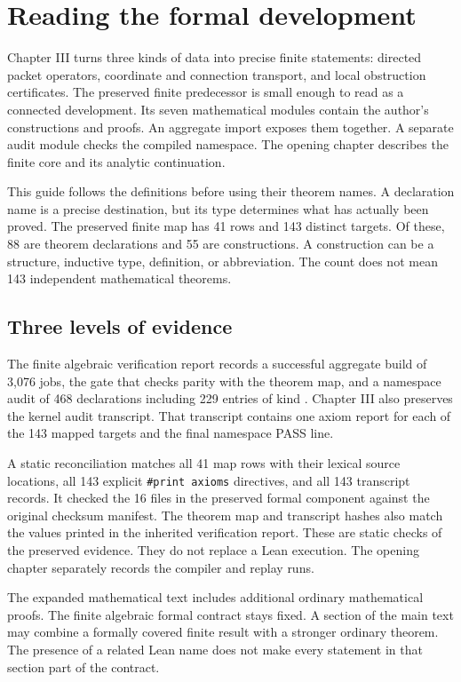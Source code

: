 \section{Reading the formal development}
Chapter III turns three kinds of data into precise finite statements: directed packet operators, coordinate and connection transport, and local obstruction certificates. The preserved finite predecessor is small enough to read as a connected development. Its seven mathematical modules contain the author's constructions and proofs. An aggregate import exposes them together. A separate audit module checks the compiled namespace. The opening chapter describes the finite core and its analytic continuation.

This guide follows the definitions before using their theorem names. A declaration name is a precise destination, but its type determines what has actually been proved. The preserved finite map has 41 rows and 143 distinct targets. Of these, 88 are theorem declarations and 55 are constructions. A construction can be a structure, inductive type, definition, or abbreviation. The count does not mean 143 independent mathematical theorems.

\subsection{Three levels of evidence}
The finite algebraic verification report records a successful aggregate build of 3,076 jobs, the gate that checks parity with the theorem map, and a namespace audit of 468 declarations including 229 entries of kind . Chapter III also preserves the kernel audit transcript. That transcript contains one axiom report for each of the 143 mapped targets and the final namespace PASS line.

A static reconciliation matches all 41 map rows with their lexical source locations, all 143 explicit \texttt{\#print axioms} directives, and all 143 transcript records. It checked the 16 files in the preserved formal component against the original checksum manifest. The theorem map and transcript hashes also match the values printed in the inherited verification report. These are static checks of the preserved evidence. They do not replace a Lean execution. The opening chapter separately records the compiler and replay runs.

The expanded mathematical text includes additional ordinary mathematical proofs. The finite algebraic formal contract stays fixed. A section of the main text may combine a formally covered finite result with a stronger ordinary theorem. The presence of a related Lean name does not make every statement in that section part of the contract.

